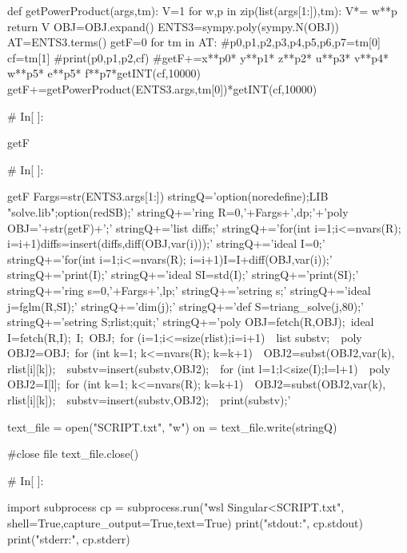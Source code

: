 def getPowerProduct(args,tm):
    V=1
    for w,p in zip(list(args[1:]),tm):
        V*= w**p
    return V
OBJ=OBJ.expand()
ENTS3=sympy.poly(sympy.N(OBJ))
AT=ENTS3.terms()
getF=0
for tm in AT:
    #p0,p1,p2,p3,p4,p5,p6,p7=tm[0]
    cf=tm[1]
    #print(p0,p1,p2,cf)
    #getF+=x**p0* y**p1* z**p2* u**p3* v**p4* w**p5* e**p5* f**p7*getINT(cf,10000)
    getF+=getPowerProduct(ENTS3.args,tm[0])*getINT(cf,10000)


# In[ ]:


getF


# In[ ]:


getF
Fargs=str(ENTS3.args[1:])
stringQ='option(noredefine);LIB "solve.lib";option(redSB);\n'
stringQ+='ring R=0,'+Fargs+',dp;\n'+'poly OBJ='+str(getF)+';\n'
stringQ+='list diffs;\n'
stringQ+='for(int i=1;i<=nvars(R); i=i+1){diffs=insert(diffs,diff(OBJ,var(i)));}\n'
stringQ+='ideal I=0;\n'
stringQ+='for(int i=1;i<=nvars(R); i=i+1){I=I+diff(OBJ,var(i));}\n'
stringQ+='print(I);'
stringQ+='ideal SI=std(I);\n'
stringQ+='print(SI);'
stringQ+='ring s=0,'+Fargs+',lp;\n'
stringQ+='setring s;\n'
stringQ+='ideal j=fglm(R,SI);\n'
stringQ+='dim(j);\n'
stringQ+='def S=triang_solve(j,80);\n'
stringQ+='setring S;rlist;quit;'
stringQ+='poly OBJ=fetch(R,OBJ);\
ideal I=fetch(R,I);\
I;\
OBJ;\
for (i=1;i<=size(rlist);i=i+1)\
{\
list substv;\
\
poly OBJ2=OBJ;\
for (int k=1; k<=nvars(R); k=k+1)\
{\
 OBJ2=subst(OBJ2,var(k), rlist[i][k]);\
}\
substv=insert(substv,OBJ2);\
\
for (int l=1;l<size(I);l=l+1)\
{\
poly OBJ2=I[l];\
 for (int k=1; k<=nvars(R); k=k+1)\
 {\
  OBJ2=subst(OBJ2,var(k), rlist[i][k]);\
 }\
 substv=insert(substv,OBJ2);\
}\
print(substv);}'

text_file = open("SCRIPT.txt", "w")
on = text_file.write(stringQ)
 
#close file
text_file.close()


# In[ ]:


import subprocess
cp = subprocess.run("wsl Singular<SCRIPT.txt", shell=True,capture_output=True,text=True)
print("stdout:", cp.stdout)
print("stderr:", cp.stderr)

